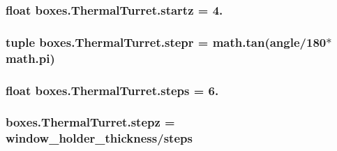 \subsubsection[{startz}]{\setlength{\rightskip}{0pt plus 5cm}float boxes.\+Thermal\+Turret.\+startz = 4.\hspace{0.3cm}{\ttfamily [static]}}\label{classboxes_1_1_thermal_turret_ac73c1f1b0ed041451a3265b27e94a132}
\hypertarget{classboxes_1_1_thermal_turret_a4e43e3ea402e72692de5043762894613}{}
\subsubsection[{stepr}]{\setlength{\rightskip}{0pt plus 5cm}tuple boxes.\+Thermal\+Turret.\+stepr = math.\+tan({\bf angle}/180$\ast$math.\+pi)\hspace{0.3cm}{\ttfamily [static]}}\label{classboxes_1_1_thermal_turret_a4e43e3ea402e72692de5043762894613}
\hypertarget{classboxes_1_1_thermal_turret_adcda318805d472c85a557b9cf8f4b7e0}{}
\subsubsection[{steps}]{\setlength{\rightskip}{0pt plus 5cm}float boxes.\+Thermal\+Turret.\+steps = 6.\hspace{0.3cm}{\ttfamily [static]}}\label{classboxes_1_1_thermal_turret_adcda318805d472c85a557b9cf8f4b7e0}
\hypertarget{classboxes_1_1_thermal_turret_a46edac8584fe0fbb4b5412b3ace9fe20}{}
\subsubsection[{stepz}]{\setlength{\rightskip}{0pt plus 5cm}boxes.\+Thermal\+Turret.\+stepz = {\bf window\+\_\+holder\+\_\+thickness}/{\bf steps}\hspace{0.3cm}{\ttfamily [static]}}\label{classboxes_1_1_thermal_turret_a46edac8584fe0fbb4b5412b3ace9fe20}
\hypertarget{classboxes_1_1_thermal_turret_ab658b9678ea4d2be36c21999d1d40ad9}{}

